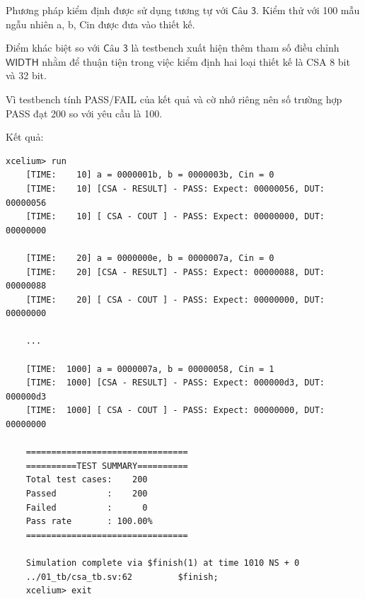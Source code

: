 \newpage
{}

Phương pháp kiểm định được sử dụng tương tự với $\textsf{Câu 3}$. Kiểm thử với 100 mẫu ngẫu nhiên {a, b, Cin} được đưa vào thiết kế.



Điểm khác biệt so với $\textsf{Câu 3}$ là testbench xuất hiện thêm tham số điều chỉnh $\textsf{WIDTH}$ nhằm để thuận tiện trong việc kiểm định hai loại thiết kế là CSA 8 bit và 32 bit. 

Vì testbench tính PASS/FAIL của kết quả và cờ nhớ riêng nên số trường hợp PASS đạt 200 so với yêu cầu là 100.

Kết quả:

\begin{lstlisting}[style=StyleResult, language=Result, caption={Kết quả kiểm định cho thiết kế CSA 8 bit.}]
	xcelium> run
	[TIME:    10] a = 0000001b, b = 0000003b, Cin = 0
	[TIME:    10] [CSA - RESULT] - PASS: Expect: 00000056, DUT: 00000056 
	[TIME:    10] [ CSA - COUT ] - PASS: Expect: 00000000, DUT: 00000000 
	
	[TIME:    20] a = 0000000e, b = 0000007a, Cin = 0
	[TIME:    20] [CSA - RESULT] - PASS: Expect: 00000088, DUT: 00000088 
	[TIME:    20] [ CSA - COUT ] - PASS: Expect: 00000000, DUT: 00000000 
	
	...
	
	[TIME:  1000] a = 0000007a, b = 00000058, Cin = 1
	[TIME:  1000] [CSA - RESULT] - PASS: Expect: 000000d3, DUT: 000000d3 
	[TIME:  1000] [ CSA - COUT ] - PASS: Expect: 00000000, DUT: 00000000 
	
	================================
	==========TEST SUMMARY==========
	Total test cases:    200    
	Passed          :    200    
	Failed          :      0    
	Pass rate       : 100.00%
	================================
	
	Simulation complete via $finish(1) at time 1010 NS + 0
	../01_tb/csa_tb.sv:62         $finish;
	xcelium> exit
\end{lstlisting}



